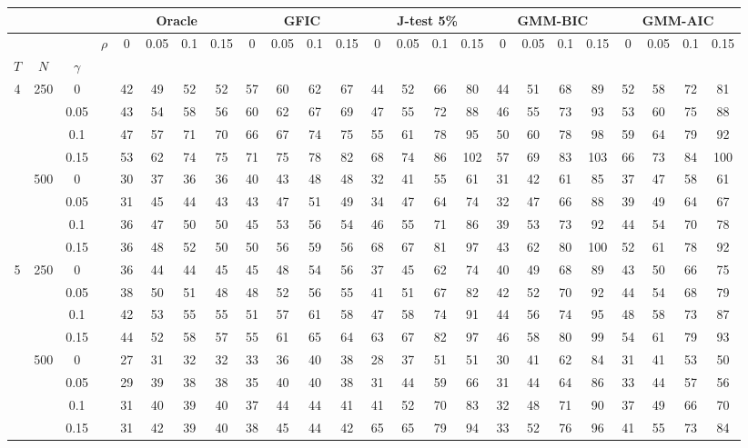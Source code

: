 \begin{tabular}{cccc|cccc|cccc|cccc|cccc|cccc} 
 \hline \hline 
\multicolumn{4}{c}{}&\multicolumn{4}{c}{Oracle}&\multicolumn{4}{c}{GFIC}&\multicolumn{4}{c}{J-test 5\%}&\multicolumn{4}{c}{GMM-BIC}&\multicolumn{4}{c}{GMM-AIC}\\ 
 \hline
 &  &  & $\rho$ & 0 & 0.05 & 0.1 & 0.15 & 0 & 0.05 & 0.1 & 0.15 & 0 & 0.05 & 0.1 & 0.15 & 0 & 0.05 & 0.1 & 0.15 & 0 & 0.05 & 0.1 & 0.15 \\
$T$ & $N$ & $\gamma$ &  &  &  &  &  &  &  &  &  &  &  &  &  &  &  &  &  &  &  &  &  \\
4 & 250 & 0 &  & 42 & 49 & 52 & 52 & 57 & 60 & 62 & 67 & 44 & 52 & 66 & 80 & 44 & 51 & 68 & 89 & 52 & 58 & 72 & 81 \\
 &  & 0.05 &  & 43 & 54 & 58 & 56 & 60 & 62 & 67 & 69 & 47 & 55 & 72 & 88 & 46 & 55 & 73 & 93 & 53 & 60 & 75 & 88 \\
 &  & 0.1 &  & 47 & 57 & 71 & 70 & 66 & 67 & 74 & 75 & 55 & 61 & 78 & 95 & 50 & 60 & 78 & 98 & 59 & 64 & 79 & 92 \\
 &  & 0.15 &  & 53 & 62 & 74 & 75 & 71 & 75 & 78 & 82 & 68 & 74 & 86 & 102 & 57 & 69 & 83 & 103 & 66 & 73 & 84 & 100 \\
 & 500 & 0 &  & 30 & 37 & 36 & 36 & 40 & 43 & 48 & 48 & 32 & 41 & 55 & 61 & 31 & 42 & 61 & 85 & 37 & 47 & 58 & 61 \\
 &  & 0.05 &  & 31 & 45 & 44 & 43 & 43 & 47 & 51 & 49 & 34 & 47 & 64 & 74 & 32 & 47 & 66 & 88 & 39 & 49 & 64 & 67 \\
 &  & 0.1 &  & 36 & 47 & 50 & 50 & 45 & 53 & 56 & 54 & 46 & 55 & 71 & 86 & 39 & 53 & 73 & 92 & 44 & 54 & 70 & 78 \\
 &  & 0.15 &  & 36 & 48 & 52 & 50 & 50 & 56 & 59 & 56 & 68 & 67 & 81 & 97 & 43 & 62 & 80 & 100 & 52 & 61 & 78 & 92 \\
5 & 250 & 0 &  & 36 & 44 & 44 & 45 & 45 & 48 & 54 & 56 & 37 & 45 & 62 & 74 & 40 & 49 & 68 & 89 & 43 & 50 & 66 & 75 \\
 &  & 0.05 &  & 38 & 50 & 51 & 48 & 48 & 52 & 56 & 55 & 41 & 51 & 67 & 82 & 42 & 52 & 70 & 92 & 44 & 54 & 68 & 79 \\
 &  & 0.1 &  & 42 & 53 & 55 & 55 & 51 & 57 & 61 & 58 & 47 & 58 & 74 & 91 & 44 & 56 & 74 & 95 & 48 & 58 & 73 & 87 \\
 &  & 0.15 &  & 44 & 52 & 58 & 57 & 55 & 61 & 65 & 64 & 63 & 67 & 82 & 97 & 46 & 58 & 80 & 99 & 54 & 61 & 79 & 93 \\
 & 500 & 0 &  & 27 & 31 & 32 & 32 & 33 & 36 & 40 & 38 & 28 & 37 & 51 & 51 & 30 & 41 & 62 & 84 & 31 & 41 & 53 & 50 \\
 &  & 0.05 &  & 29 & 39 & 38 & 38 & 35 & 40 & 40 & 38 & 31 & 44 & 59 & 66 & 31 & 44 & 64 & 86 & 33 & 44 & 57 & 56 \\
 &  & 0.1 &  & 31 & 40 & 39 & 40 & 37 & 44 & 44 & 41 & 41 & 52 & 70 & 83 & 32 & 48 & 71 & 90 & 37 & 49 & 66 & 70 \\
 &  & 0.15 &  & 31 & 42 & 39 & 40 & 38 & 45 & 44 & 42 & 65 & 65 & 79 & 94 & 33 & 52 & 76 & 96 & 41 & 55 & 73 & 84 \\
\hline
\end{tabular}